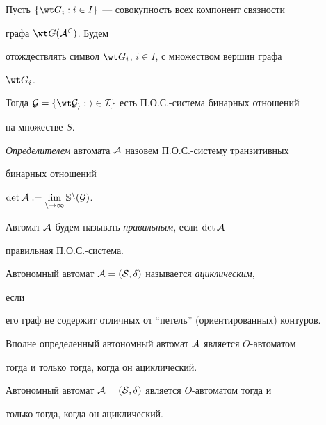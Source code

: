 Пусть $\{\wt G_i:i\in I\}$ --- совокупность всех компонент связности


графа $\wt G(\cal A^2)$. Будем


отождествлять символ $\wt G_i$, $i\in I$, с множеством вершин графа


$\wt G_i$.


Тогда $\cal G=\{\wt G_i:i\in I\}$ есть П.О.С.-система бинарных отношений


на множестве $S$.





{\em Определителем} автомата $\cal A$ назовем П.О.С.-систему транзитивных


бинарных отношений


$\det\cal A:=\lim\limits_{n\to\infty}\Bbb S^n(\cal G)$.





Автомат $\cal A$ будем называть {\em правильным}, если $\det\cal A$ ---


правильная П.О.С.-система.





Автономный автомат $\cal A=(S,\delta)$ называется {\em ациклическим},


если


его граф не содержит отличных от ``петель'' (ориентированных) контуров.





\begin{assrt}


Вполне определенный автономный автомат $\cal A$ является $O$-авто\-матом


тогда и только тогда, когда он ациклический.


\end{assrt}





\begin{assrt}


Автономный автомат $\cal A=(S,\delta)$ является $O$-автоматом тогда и


только тогда, когда он ациклический.


\end{assrt}





